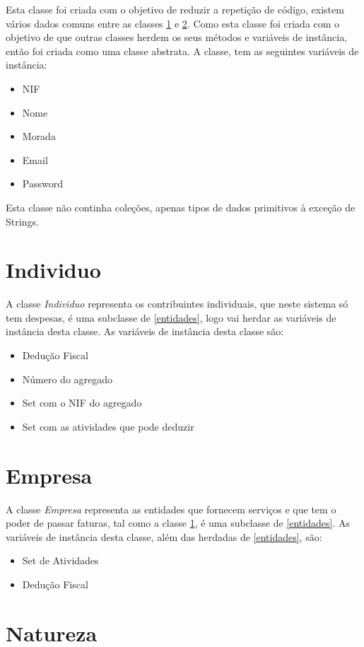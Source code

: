 \documentclass[10pt, a4paper]{report}
\begin{document}
Esta classe foi criada com o objetivo de reduzir a repetição de código, existem vários dados comuns entre as classes \ref{Individuo} e \ref{Empresa}. Como esta classe foi criada com o objetivo de que outras classes herdem os seus métodos e variáveis de instância, então foi criada como uma classe abstrata.
A classe, tem as seguintes variáveis de instância:
\begin{itemize}
	\item NIF
	\item Nome
	\item Morada
	\item Email
	\item Password
\end{itemize}
Esta classe não continha coleções, apenas tipos de dados primitivos à exceção de Strings.

\section{Individuo}\label{Individuo}

A classe \emph{Individuo} representa os contribuintes individuais, que neste sistema só tem despesas, é uma subclasse de \ref{entidades}, logo vai herdar as variáveis de instância desta classe. As variáveis de instância desta classe são:
\begin{itemize}
	\item Dedução Fiscal
	\item Número do agregado
	\item Set com o NIF do agregado
	\item Set com as atividades que pode deduzir
\end{itemize}

\section{Empresa}\label{Empresa}

A classe \emph{Empresa} representa as entidades que fornecem serviços e que tem o poder de passar faturas, tal como a classe \ref{Individuo}, é uma subclasse de \ref{entidades}. As variáveis de instância desta classe, além das herdadas de \ref{entidades}, são:
\begin{itemize}
	\item Set de Atividades
	\item Dedução Fiscal
\end{itemize}

\section{Natureza}\label{Nat}
\end{document}
